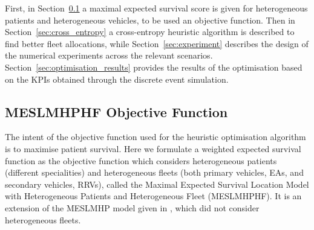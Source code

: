 \documentclass[preprint,12pt]{elsarticle}
\begin{document}
First, in Section~\ref{sec:objective_function} a maximal expected survival score
is given for heterogeneous patients and heterogeneous vehicles, to be used an
objective function. Then in Section~\ref{sec:cross_entropy} a cross-entropy
heuristic algorithm is described to find better fleet allocations, while
Section~\ref{sec:experiment} describes the design of the numerical experiments
across the relevant scenarios. Section~\ref{sec:optimisation_results} provides
the results of the optimisation based on the KPIs obtained through the discrete
event simulation.


\subsection{MESLMHPHF Objective Function}\label{sec:objective_function} The
intent of the objective function used for the heuristic optimisation algorithm
is to maximise patient survival. Here we formulate a weighted expected survival
function as the objective function which considers heterogeneous patients
(different specialities) and heterogeneous fleets (both primary vehicles, EAs,
and secondary vehicles, RRVs), called the Maximal Expected Survival Location
Model with Heterogeneous Patients and Heterogeneous Fleet (MESLMHPHF). It is an
extension of the MESLMHP model given in \cite{Knight2012918}, which did not
consider heterogeneous fleets.

\end{document}

